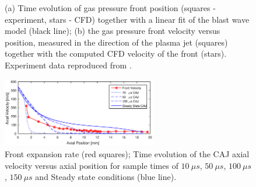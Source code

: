 \documentclass[a4paper]{iacas}%
\begin{document}
\begin{figure}
	\centering
	\caption{(a) Time evolution of gas pressure front position (squares - experiment, stars - CFD) together with a linear fit of the blast wave model (black line); (b) the gas pressure front velocity versus position, measured in the direction of the plasma jet (squares) together with the computed CFD velocity of the front (stars). Experiment data reproduced from \cite{KR}.}
	\label{fig:model_blast}
\end{figure}

\begin{figure}
	\centering
	\includegraphics[width=0.6\textwidth]{Vel_Times.eps}
	\caption{Front expansion rate (red squares); Time evolution of the CAJ axial velocity versus axial position for sample times of $10~\mu s$, $50~\mu s$, $100~\mu s$, $150~\mu s$ and Steady state conditions (blue line).}
	\label{fig:model_caj_velocity}
\end{figure}
\end{document}
